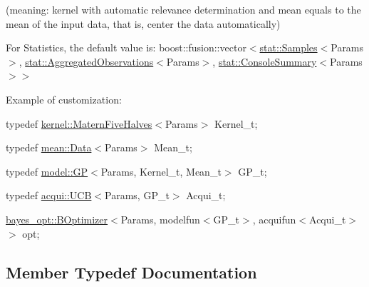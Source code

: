 (meaning\+: kernel with automatic relevance determination and mean equals to the mean of the input data, that is, center the data automatically)

For Statistics, the default value is\+: {\ttfamily boost\+::fusion\+::vector$<$\hyperlink{structlimbo_1_1stat_1_1_samples}{stat\+::\+Samples}$<$Params$>$, \hyperlink{structlimbo_1_1stat_1_1_aggregated_observations}{stat\+::\+Aggregated\+Observations}$<$Params$>$, \hyperlink{structlimbo_1_1stat_1_1_console_summary}{stat\+::\+Console\+Summary}$<$Params$>$$>$}

Example of customization\+:
\begin{DoxyItemize}
\item {\ttfamily typedef \hyperlink{structlimbo_1_1kernel_1_1_matern_five_halves}{kernel\+::\+Matern\+Five\+Halves}$<$Params$>$ Kernel\+\_\+t;}
\item {\ttfamily typedef \hyperlink{structlimbo_1_1mean_1_1_data}{mean\+::\+Data}$<$Params$>$ Mean\+\_\+t;}
\item {\ttfamily typedef \hyperlink{classlimbo_1_1model_1_1_g_p}{model\+::\+G\+P}$<$Params, Kernel\+\_\+t, Mean\+\_\+t$>$ G\+P\+\_\+t;}
\item {\ttfamily typedef \hyperlink{classlimbo_1_1acqui_1_1_u_c_b}{acqui\+::\+U\+C\+B}$<$Params, G\+P\+\_\+t$>$ Acqui\+\_\+t;}
\item {\ttfamily \hyperlink{classlimbo_1_1bayes__opt_1_1_b_optimizer}{bayes\+\_\+opt\+::\+B\+Optimizer}$<$Params, modelfun$<$G\+P\+\_\+t$>$, acquifun$<$Acqui\+\_\+t$>$$>$ opt;} 
\end{DoxyItemize}

\subsection{Member Typedef Documentation}
\hypertarget{classlimbo_1_1bayes__opt_1_1_bo_base_a200a43abb6c95d2d99660898b36f2200}{}
